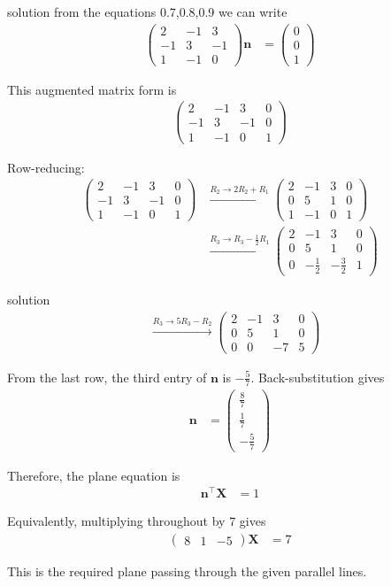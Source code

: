 \documentclass{beamer}
\numberwithin{equation}{section}
\theoremstyle{remark}
\newcommand{\myvec}[1]{\ensuremath{\begin{pmatrix}#1\end{pmatrix}}}
\let\vec\mathbf
\begin{document}
\begin{frame}{solution}
from the equations 0.7,0.8,0.9 we can write 
\begin{align}
\myvec{2 & -1 & 3 \\ -1 & 3 & -1 \\ 1 & -1 & 0}\vec{n}
&= \myvec{0 \\ 0 \\ 1}
\end{align}

\noindent
This augmented matrix form is
\begin{align}
\myvec{2 & -1 & 3 & 0 \\ -1 & 3 & -1 & 0 \\ 1 & -1 & 0 & 1}
\end{align}

\noindent
Row-reducing:
\begin{align}
\myvec{2 & -1 & 3 & 0 \\ -1 & 3 & -1 & 0 \\ 1 & -1 & 0 & 1}
&\xrightarrow{R_2 \to 2R_2+R_1}
\myvec{2 & -1 & 3 & 0 \\ 0 & 5 & 1 & 0 \\ 1 & -1 & 0 & 1} \\[6pt]
&\xrightarrow{R_3 \to R_3 - \tfrac{1}{2}R_1}
\myvec{2 & -1 & 3 & 0 \\ 0 & 5 & 1 & 0 \\ 0 & -\tfrac{1}{2} & -\tfrac{3}{2} & 1} 
\end{align}
\end{frame}
\begin{frame}{solution}
\begin{align}
&\xrightarrow{R_3 \to 5R_3 - R_2}
\myvec{2 & -1 & 3 & 0 \\ 0 & 5 & 1 & 0 \\ 0 & 0 & -7 & 5}
\end{align}

\noindent
From the last row, the third entry of $\vec{n}$ is $-\tfrac{5}{7}$.  
Back-substitution gives
\begin{align}
\vec{n} &= \myvec{\tfrac{8}{7} \\[4pt] \tfrac{1}{7} \\[4pt] -\tfrac{5}{7}}
\end{align}

\noindent
Therefore, the plane equation is
\begin{align}
\vec{n}^\top \vec{X} &= 1
\end{align}

\noindent
Equivalently, multiplying throughout by $7$ gives
\begin{align}
\myvec{8 & 1 & -5}\vec{X} &= 7
\end{align}

\noindent
This is the required plane passing through the given parallel lines.
\end{frame}
\end{document}
